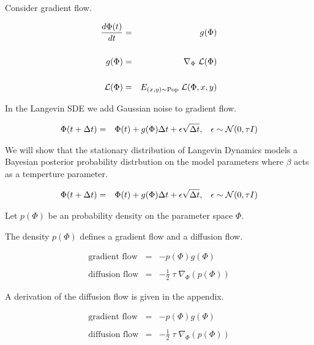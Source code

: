 {

Consider gradient flow.

\begin{eqnarray*}
\frac{d\Phi(t)}{dt} & = & g(\Phi) \\
\\
g(\Phi) & = & \nabla_\Phi\;{\cal L}(\Phi) \\
\\
{\cal L}(\Phi) & = & E_{(x,y) \sim \mathrm{Pop}}\;{\cal L}(\Phi,x,y)
\end{eqnarray*}


In the Langevin SDE we add Gaussian noise to gradient flow.

\begin{eqnarray*}
\Phi(t + \Delta t) & = & \Phi(t) + g(\Phi)\Delta t + \epsilon \sqrt{\Delta t},\;\;\;\epsilon \sim {\cal N}(0,\tau I)
\end{eqnarray*}

\vfill
We will show that the stationary distribution of Langevin Dynamics models a Bayesian posterior probability distrbution on
the model parameters where $\beta$ acts as a temperture parameter.



\begin{eqnarray*}
\Phi(t + \Delta t) & = & \Phi(t) + g(\Phi)\Delta t + \epsilon \sqrt{\Delta t},\;\;\;\epsilon \sim {\cal N}(0,\tau I)
\end{eqnarray*}

Let $p(\Phi)$ be an probability density on the parameter space $\Phi$.

\vfill
The density $p(\Phi)$ defines a gradient flow and a diffusion flow.

\begin{eqnarray*}
\mbox{gradient flow} & = & - p(\Phi)g(\Phi) \\
\\
\mbox{diffusion flow} & = & - \frac{1}{2} \;\tau\;\nabla_\Phi(p(\Phi))
\end{eqnarray*}

A derivation of the diffusion flow is given in the appendix.


\begin{eqnarray*}
\mbox{gradient flow} & = & - p(\Phi)g(\Phi) \\
\\
\mbox{diffusion flow} & = & - \frac{1}{2} \;\tau\;\nabla_\Phi(p(\Phi))
\end{eqnarray*}

}
